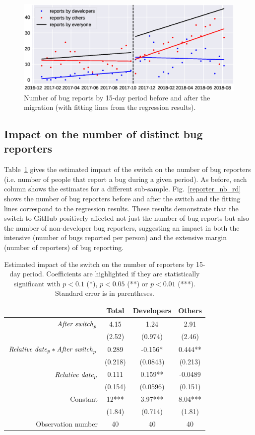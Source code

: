 \documentclass[runningheads]{llncs}
\begin{document}
\begin{figure}
\includegraphics[width=\textwidth]{bug_nb_rd.eps}
\caption{Number of bug reports by 15-day period before and after the migration (with fitting lines from the regression results).} \label{bug_nb_rd}
\end{figure}


\subsection{Impact on the number of distinct bug reporters}

Table~\ref{tab:reporters} gives the estimated impact of the switch on the number of bug reporters (i.e. number of people that report a bug during a given period). As before, each column shows the estimates for a different sub-sample. Fig.~\ref{reporter_nb_rd}  shows the number of bug reporters before and after the switch and the fitting lines correspond to the regression results. These results demonstrate that the switch to GitHub positively affected not just the number of bug reports but also the number of non-developer bug reporters, suggesting an impact in both the intensive (number of bugs reported per person) and the extensive margin (number of reporters) of bug reporting.

\begin{table}
\centering
\caption{Estimated impact of the switch on the number of reporters by 15-day period. Coefficients are highlighted if they are statistically significant with $p<0.1$ (*), $p<0.05$ (**) or $p<0.01$ (***). Standard error is in parentheses.}\label{tab:reporters}
\begin{tabular}{|r|c|c|c|}
\hline
&  Total & Developers & Others \\
\hline
$\mbox{\emph{After switch}}_p$ & 4.15 & 1.24 & 2.91 \\
& (2.52) & (0.974) & (2.46) \\
\hline
$\mbox{\emph{Relative date}}_p * \mbox{\emph{After switch}}_p$ & 0.289 & -0.156* & 0.444** \\
& (0.218) & (0.0843) & (0.213) \\
\hline
$\mbox{\emph{Relative date}}_p$ & 0.111 & 0.159** & -0.0489 \\
& (0.154) & (0.0596) & (0.151) \\
\hline
Constant & 12*** & 3.97*** & 8.04*** \\
& (1.84) & (0.714) & (1.81) \\
\hline
Observation number & 40 & 40 & 40 \\
\hline
\end{tabular}
\end{table}
\end{document}
